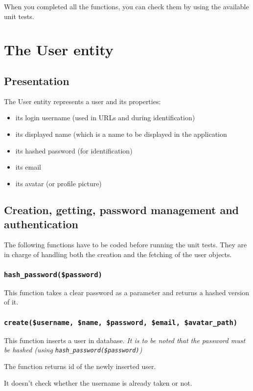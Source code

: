 \documentclass[twoside,a4paper,12pt]{article}
\begin{document}
When you completed all the functions, you can check them by using the available unit tests.

\section{The User entity}

\subsection{Presentation}
The User entity represents a user and its properties:

\begin{itemize}
\item its login username (used in URLs and during identification)
\item its displayed name (which is a name to be displayed in the application
\item its hashed password (for identification)
\item its email
\item its avatar (or profile picture)
\end{itemize}

\subsection{Creation, getting, password management and authentication}
The following functions have to be coded before running the unit tests. They are in charge of handling both the creation and the fetching of the user objects.

\subsubsection{\texttt{hash\_password(\$password)}}
This function takes a clear password as a parameter and returns a hashed version of it.

\subsubsection{\texttt{create(\$username, \$name, \$password, \$email, \$avatar\_path)}}

This function inserts a user in database. \textit{It is to be noted that the password must be hashed (using \texttt{hash\_password(\$password)})}

The function returns id of the newly inserted user.

It doesn't check whether the username is already taken or not.
\end{document}
